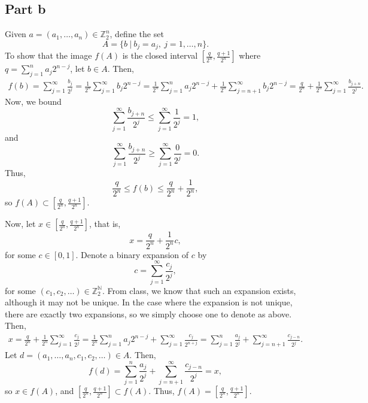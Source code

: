 \documentclass{article}
\begin{document}
\subsection{Part b}
Given $a=(a_1,\ldots,a_n)\in\mathbb{Z}^n_2$, define the set
\[
A=\{b~|~b_j=a_j,~j=1,\ldots,n\}.
\]
To show that the image $f(A)$ is the closed interval $\left[\frac{q}{2^n},\frac{q+1}{2^n}\right]$ where $q=\sum_{j=1}^na_j2^{n-j}$, let $b\in A$. Then,
\begin{align*}
f(b)=\sum_{j=1}^\infty\frac{b_j}{2^j}=\frac{1}{2^n}\sum_{j=1}^\infty b_j2^{n-j}=\frac{1}{2^n}\sum_{j=1}^n a_j2^{n-j}+\frac{1}{2^n}\sum_{j=n+1}^\infty b_j2^{n-j}=\frac{q}{2^n}+\frac{1}{2^n}\sum_{j=1}^\infty\frac{b_{j+n}}{2^j}.
\end{align*}
Now, we bound
\[
\sum_{j=1}^\infty\frac{b_{j+n}}{2^j}\leq\sum_{j=1}^\infty\frac{1}{2^j}=1,
\] 
and
\[
\sum_{j=1}^\infty\frac{b_{j+n}}{2^j}\geq\sum_{j=1}^\infty\frac{0}{2^j}=0.
\]
Thus,
\[
\frac{q}{2^n}\leq f(b)\leq\frac{q}{2^n}+\frac{1}{2^n},
\]
so $f(A)\subset\left[\frac{q}{2^n},\frac{q+1}{2^n}\right]$. 

Now, let $x\in\left[\frac{q}{2^n},\frac{q+1}{2^n}\right]$, that is, 
\[
x=\frac{q}{2^n}+\frac{1}{2^n}c,
\]
for some $c\in[0,1]$. Denote a binary expansion of $c$ by
\[
c=\sum_{j=1}^\infty\frac{c_j}{2^j},
\]
for some $(c_1,c_2,\ldots)\in\mathbb{Z}^\mathbb{N}_2$. From class, we know that such an expansion exists, although it may not be unique. In the case where the expansion is not unique, there are exactly two expansions, so we simply choose one to denote as above. Then,
\begin{align*}
x=\frac{q}{2^n}+\frac{1}{2^n}\sum_{j=1}^\infty\frac{c_j}{2^j}=\frac{1}{2^n}\sum_{j=1}^na_j2^{n-j}+\sum_{j=1}^\infty\frac{c_j}{2^{n+j}}=\sum_{j=1}^n\frac{a_j}{2^{j}}+\sum_{j=n+1}^\infty\frac{c_{j-n}}{2^{j}}.
\end{align*}
Let $d=(a_1,\ldots,a_n,c_{1},c_{2},\ldots)\in A$. Then, 
\[
f(d)=\sum_{j=1}^n\frac{a_j}{2^{j}}+\sum_{j=n+1}^\infty\frac{c_{j-n}}{2^{j}}=x,
\]
so $x\in f(A)$, and $\left[\frac{q}{2^n},\frac{q+1}{2^n}\right]\subset f(A)$. Thus, $f(A)=\left[\frac{q}{2^n},\frac{q+1}{2^n}\right]$. 
\end{document}

